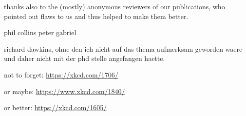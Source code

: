 thanks also to the (mostly) anonymous reviewers of our publications,
who pointed out flaws to us and thus helped to make them better.


phil collins peter gabriel

richard dawkins, ohne den ich nicht auf das thema aufmerksam geworden waere und daher nicht mit der phd stelle angefangen haette.

not to forget:
\url{https://xkcd.com/1706/}

or maybe:
\url{https://www.xkcd.com/1840/}

or better:
\url{https://xkcd.com/1605/}




